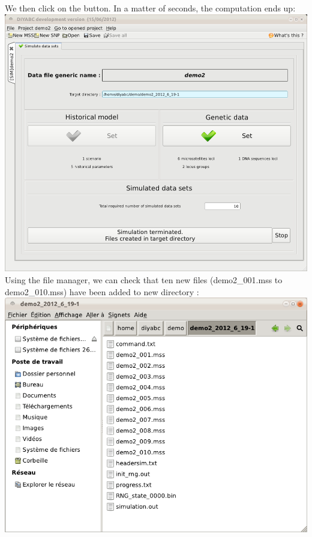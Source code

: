 \newpage
We then click on the  button. In a matter of seconds, the computation ends up:\\

\includegraphics[scale=0.33]{gui_pictures/Capture-DIYABC-86.png} \\

Using the file manager, we can check that ten new files (\textsf{demo2\_001.mss} to \textsf{demo2\_010.mss}) have been added to new directory :\\

\includegraphics[scale=0.33]{gui_pictures/Capture-DIYABC-87.png} \\

